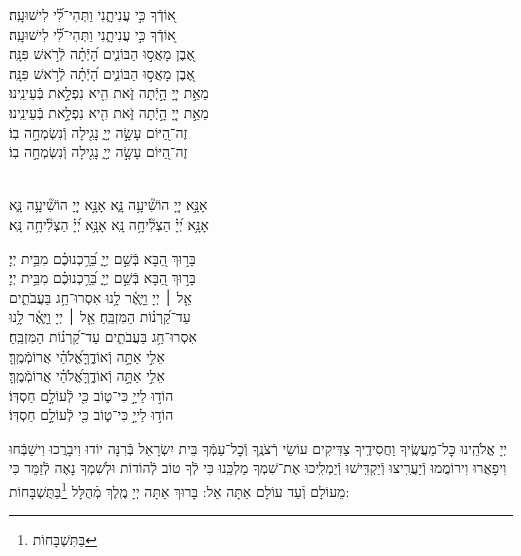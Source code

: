 \documentclass[twoside, openany, parskip=half, 11pt]{book}
\begin{document}
{\begin{narrow}
א֭וֹדְֿךָ כִּ֣י עֲנִיתָ֑נִי \hfill וַתְּהִי־לִ֗֝י לִישׁוּעָֽה׃ \\
\scriptsize{ א֭וֹדְֿךָ כִּ֣י עֲנִיתָ֑נִי \hfill וַתְּהִי־לִ֗֝י לִישׁוּעָֽה׃ \\}\normalsize{}
אֶ֭בֶן מָאֲס֣וּ הַבּוֹנִ֑ים \hfill הָ֝יְֿתָ֗ה לְֿרֹ֣אשׁ פִּנָּֽה׃ \\
\scriptsize{ אֶ֭בֶן מָאֲס֣וּ הַבּוֹנִ֑ים \hfill הָ֝יְֿתָ֗ה לְֿרֹ֣אשׁ פִּנָּֽה׃ \\}\normalsize{}
מֵאֵ֣ת יְיָ֭ הָ֣יְֿתָה זֹּ֑את \hfill הִ֖יא נִפְלָ֣את בְּֿעֵינֵֽינוּ׃ \\
\scriptsize{ מֵאֵ֣ת יְיָ֭ הָ֣יְֿתָה זֹּ֑את \hfill הִ֖יא נִפְלָ֣את בְּֿעֵינֵֽינוּ׃ \\}\normalsize{}
זֶה־הַ֭יּוֹם עָשָׂ֣ה יְיָ֑ \hfill נָגִ֖ילָה וְֿנִשְׂמְחָ֣ה בֽוֹ׃ \\
\scriptsize{ זֶה־הַ֭יּוֹם עָשָׂ֣ה יְיָ֑ \hfill נָגִ֖ילָה וְֿנִשְׂמְחָ֣ה בֽוֹ׃ } \normalsize{}


\\
אָנָּ֣א יְיָ֭ הוֹשִׁ֘יעָ֥ה נָּ֑א \hfill \scriptsize{אָנָּ֣א יְיָ֭ הוֹשִׁ֘יעָ֥ה נָּ֑א}\\ \normalsize
אָנָּ֥א יְ֝יָ֗ הַצְלִ֘יחָ֥ה נָּֽא \hfill \scriptsize{ אָנָּ֥א יְ֝יָ֗ הַצְלִ֘יחָ֥ה נָּֽא׃}\\ \normalsize


בָּר֣וּךְ הַ֭בָּא בְּֿשֵׁ֣ם יְיָ֑ \hfill בֵּ֝רַ֥כְנוּכֶ֗ם מִבֵּ֥ית יְיָ׃\\
\scriptsize{בָּר֣וּךְ הַ֭בָּא בְּֿשֵׁ֣ם יְיָ֑ \hfill בֵּ֝רַ֥כְנוּכֶ֗ם מִבֵּ֥ית יְיָ׃}\\
\normalsize{אֵ֤ל ׀ יְיָ וַיָּ֢אֶ֫ר לָ֥נוּ \hfill אִסְרוּ־חַ֥ג בַּעֲבֹתִ֑ים \\ עַד־קַ֝רְנ֗וֹת הַמִּזְבֵּֽחַ׃ \hfill }
\scriptsize{אֵ֤ל ׀ יְיָ וַיָּ֢אֶ֫ר לָ֥נוּ \\ אִסְרוּ־חַ֥ג בַּעֲבֹתִ֑ים \hfill עַד־קַ֝רְנ֗וֹת הַמִּזְבֵּֽחַ׃}\\
\normalsize{אֵלִ֣י אַתָּ֣ה וְֿאוֹדֶ֑ךָּ\hfill אֱ֝לֹהַ֗י אֲרוֹמְֿמֶֽךָּ׃}\\
\scriptsize{אֵלִ֣י אַתָּ֣ה וְֿאוֹדֶ֑ךָּ\hfill אֱ֝לֹהַ֗י אֲרוֹמְֿמֶֽךָּ׃}\\
\normalsize{הוֹד֣וּ לַייָ֣ כִּי־ט֑וֹב \hfill כִּ֖י לְֿעוֹלָ֣ם חַסְדּֽוֹ׃ }\\
\scriptsize{הוֹד֣וּ לַייָ֣ כִּי־ט֑וֹב \hfill כִּ֖י לְֿעוֹלָ֣ם חַסְדּֽוֹ׃ } \\
\normalsize{}

\end{narrow}

\negline

יְיָ אֱלֹהֵֽינוּ כׇּל־מַעֲשֶֽׂיךָ וַחֲסִידֶֽיךָ צַדִּיקִים עוֹשֵׂי רְֿצֹנֶֽךָ וְֿכׇל־עַמְּֿךָ בֵּית יִשְׂרָאֵל בְּֿרִנָּה יוֹדוּ וִיבָרֲכוּ וִישַׁבְּֿחוּ וִיפָאֲרוּ וִירוֹמֲמוּ וְֿיַעֲרִֽיצוּ וְֿיַקְדִּֽישׁוּ וְֿיַמְלִֽיכוּ אֶת־שִׁמְךָ מַלְכֵּֽנוּ כִּי לְֿךָ טוֹב לְֿהוֹדוֹת וּלְשִׁמְךָ נָאֶה לְֿזַמֵּר כִּי מֵעוֹלָם וְֿעַד עוֹלָם אַתָּה אֵל: בָּרוּךְ אַתָּה יְיָ מֶֽלֶךְ מְֿהֻלָּל \footnote{בַּתִּשְׁבָּחוֹת}בַּתֻּשְׁבָּחוֹת:
}
\end{document}
